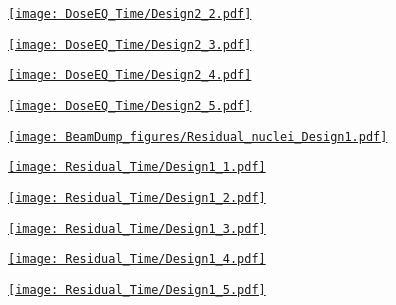 \documentclass[xcolor={dvipsnames}]{beamer}
\begin{document}
\begin{frame}[plain]
 \hypertarget{Dose_equivalent_hour_Design2}{\hyperlink{coolingtimesprev_Design2}{\texttt{[image: DoseEQ\_Time/Design2\_2.pdf]}}}
\end{frame}
\begin{frame}[plain]
 \hypertarget{Dose_equivalent_day_Design2}{\hyperlink{coolingtimesprev_Design2}{\texttt{[image: DoseEQ\_Time/Design2\_3.pdf]}}}
\end{frame}
\begin{frame}[plain]
 \hypertarget{Dose_equivalent_month_Design2}{\hyperlink{coolingtimesprev_Design2}{\texttt{[image: DoseEQ\_Time/Design2\_4.pdf]}}}
\end{frame}
\begin{frame}[plain]
 \hypertarget{Dose_equivalent_year_Design2}{\hyperlink{coolingtimesprev_Design2}{\texttt{[image: DoseEQ\_Time/Design2\_5.pdf]}}}
\end{frame}
\begin{frame}[plain]
 \hypertarget{Residual_nuclei_Design1}{\hyperlink{residualtimesprev_Design1}{\texttt{[image: BeamDump\_figures/Residual\_nuclei\_Design1.pdf]}}}
\end{frame}
\begin{frame}[plain]
 \hypertarget{Residual_nuclei_minute_Design1}{\hyperlink{residualtimesprev_Design1}{\texttt{[image: Residual\_Time/Design1\_1.pdf]}}}
\end{frame}
\begin{frame}[plain]
 \hypertarget{Residual_nuclei_hour_Design1}{\hyperlink{residualtimesprev_Design1}{\texttt{[image: Residual\_Time/Design1\_2.pdf]}}}
\end{frame}
\begin{frame}[plain]
 \hypertarget{Residual_nuclei_day_Design1}{\hyperlink{residualtimesprev_Design1}{\texttt{[image: Residual\_Time/Design1\_3.pdf]}}}
\end{frame}
\begin{frame}[plain]
 \hypertarget{Residual_nuclei_month_Design1}{\hyperlink{residualtimesprev_Design1}{\texttt{[image: Residual\_Time/Design1\_4.pdf]}}}
\end{frame}
\begin{frame}[plain]
 \hypertarget{Residual_nuclei_year_Design1}{\hyperlink{residualtimesprev_Design1}{\texttt{[image: Residual\_Time/Design1\_5.pdf]}}}
\end{frame}
\end{document}
